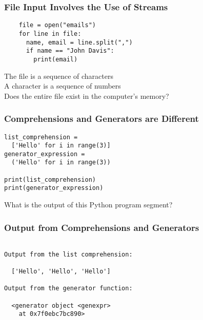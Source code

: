 \documentclass[14pt,aspectratio=169]{beamer}
\begin{document}
%
\begin{frame}[fragile]
  \frametitle{File Input Involves the Use of Streams}
  \normalsize
  \hspace*{-.65in}
  \begin{minipage}{6in}
    \vspace*{.25in}
    \begin{verbatim}
    file = open("emails")
    for line in file:
      name, email = line.split(",")
      if name == "John Davis":
        print(email)
    \end{verbatim}
  \end{minipage}
  \vspace*{.25in}
  \begin{center}
    \normalsize \noindent The file is a sequence of characters \\
    \normalsize \noindent A character is a sequence of numbers \\
    \normalsize \noindent Does the entire file exist in the computer's
    memory? \\
  \end{center}
\end{frame}

%
\begin{frame}[fragile]
  \frametitle{Comprehensions and Generators are Different}
  \normalsize
  \begin{minipage}{6in}
    \vspace*{.2in}
    \begin{verbatim}
list_comprehension =
  ['Hello' for i in range(3)]
generator_expression =
  ('Hello' for i in range(3))

print(list_comprehension)
print(generator_expression)
    \end{verbatim}
  \end{minipage}
  \vspace*{.05in}
  \begin{center}
    \normalsize \noindent What is the output of this Python program segment? \\
  \end{center}
\end{frame}

%
\begin{frame}[fragile]
  \frametitle{Output from Comprehensions and Generators}
  \normalsize
  \begin{minipage}{6in}
    \vspace*{.2in}
    \begin{verbatim}

Output from the list comprehension:

  ['Hello', 'Hello', 'Hello']

Output from the generator function:

  <generator object <genexpr>
    at 0x7f0ebc7bc890>

    \end{verbatim}
  \end{minipage}
\end{frame}
\end{document}
